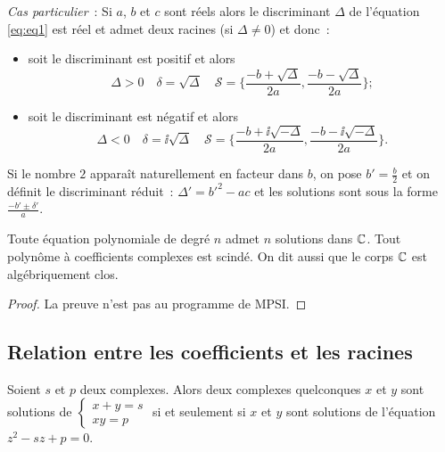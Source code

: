 \emph{Cas particulier}~: Si \(a\), \(b\) et \(c\) sont réels alors le 
discriminant \(\Delta\) de l'équation \eqref{eq:eq1} est réel et admet deux 
racines (si \(\Delta \neq 0\)) et donc~:
\begin{itemize}
    \item soit le discriminant est positif et alors
        \begin{equation}
            \Delta >0 \quad \delta = \sqrt{\Delta} \quad \mathcal{S} = 
            \biggl\lbrace \frac{-b + \sqrt{\Delta}}{2a} , 
                \frac{-b-\sqrt{\Delta}}{2a} \biggl\rbrace;
            \end{equation}
        \item soit le discriminant est négatif et alors
            \begin{equation}
                \Delta <0 \quad \delta = \ii\sqrt{\Delta} \quad \mathcal{S} = 
                \biggl\lbrace \frac{-b + \ii\sqrt{-\Delta}}{2a} , 
                    \frac{-b-\ii\sqrt{-\Delta}}{2a} \biggl\rbrace.
                \end{equation}
        \end{itemize}

Si le nombre \(2\) apparaît naturellement en facteur dans \(b\), on pose 
\(b' = \frac{b}{2}\) et on définit le discriminant réduit~: \(\Delta' = 
b'^2-ac\) et les solutions sont sous la forme \(\frac{-b'\pm \delta'}{a}\).

\begin{theo}
    Toute équation polynomiale de degré \(n\) admet \(n\) solutions dans \(\mathbb{C}\).  
    Tout polynôme à coefficients complexes est scindé. On dit aussi que le corps 
    \(\mathbb{C}\) est algébriquement clos.
\end{theo}

\begin{proof}
    La preuve n'est pas au programme de MPSI.
\end{proof}

\subsection{Relation entre les coefficients et les racines}
\label{subsec:relationcoefsracines}

\begin{prop}
    Soient \(s\) et \(p\) deux complexes. Alors deux complexes quelconques \(x\) 
    et \(y\) sont solutions de \(\begin{cases} x  + y = s \\ xy = p 
    \end{cases}\) si et seulement si \(x\) et \(y\) sont solutions de l'équation 
    \(z^2 -sz + p = 0\).
\end{prop}

